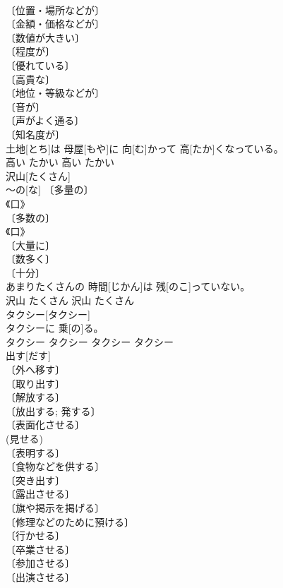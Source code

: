 \documentclass[8pt]{extreport}
\begin{document}
\begin{CJK}{UTF8}{min}
\\	〔位置・場所などが〕 
\\	〔金額・価格などが〕 
\\	〔数値が大きい〕 
\\	〔程度が〕 
\\	〔優れている〕 
\\	〔高貴な〕 
\\	〔地位・等級などが〕 
\\	〔音が〕 
\\	〔声がよく通る〕 
\\	〔知名度が〕 
\\	土地[とち]は 母屋[もや]に 向[む]かって 高[たか]くなっている。	
\\	高い	たかい	高い	たかい	
\\	沢山[たくさん]	
\\	～の[な] 〔多量の〕 
\\	《口》 
\\	〔多数の〕 
\\	《口》 
\\	〔大量に〕 
\\	〔数多く〕 
\\	〔十分〕 
\\	あまりたくさんの 時間[じかん]は 残[のこ]っていない。	
\\	沢山	たくさん	沢山	たくさん	
\\	タクシー[タクシー]	
\\	タクシーに 乗[の]る。	
\\	タクシー	タクシー	タクシー	タクシー	
\\	出す[だす]	
\\	〔外へ移す〕 
\\	〔取り出す〕 
\\	〔解放する〕 
\\	〔放出する; 発する〕 
\\	〔表面化させる〕 
\\	(見せる) 
\\	〔表明する〕 
\\	〔食物などを供する〕 
\\	〔突き出す〕 
\\	〔露出させる〕 
\\	〔旗や掲示を掲げる〕 
\\	〔修理などのために預ける〕 
\\	〔行かせる〕 
\\	〔卒業させる〕 
\\	〔参加させる〕 
\\	〔出演させる〕 

\end{CJK}
\end{document}
